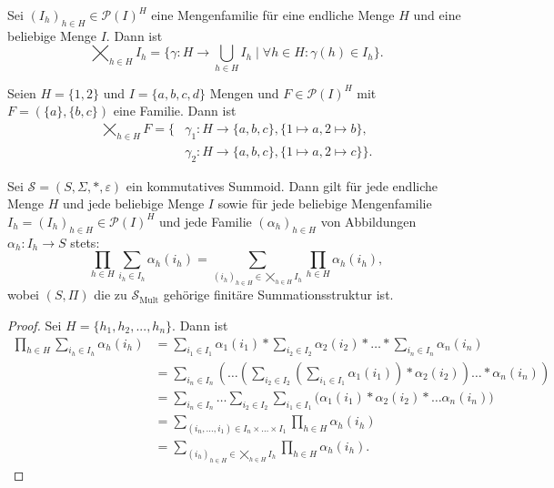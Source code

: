 \documentclass{article}
\begin{document}
\begin{definition}
  Sei $(I_h)_{h \in H} \in \mathcal{P}(I)^H$ eine Mengenfamilie für eine endliche Menge $H$ und eine beliebige Menge $I$.
  Dann ist 
  \begin{equation*}
    \bigtimes_{h \in H}I_h = \{\gamma \colon H \to \bigcup_{h \in H}I_h \mid \forall h \in H \colon \gamma(h) \in I_h\}.
  \end{equation*}
\end{definition}

\begin{example}
  Seien $H = \{1, 2\}$ und $I = \{a, b, c, d\}$ Mengen und $F \in \mathcal{P}(I)^H$ 
  mit $F = (\{a\}, \{b, c\})$ eine Familie.
  Dann ist
  \begin{align*}
    \bigtimes_{h \in H}F = \{&\gamma_1 \colon H \to \{a, b, c\}, \{ 1 \mapsto a, 2 \mapsto b\}, \\ 
                              &\gamma_2 \colon H \to \{a, b, c\}, \{ 1 \mapsto a, 2 \mapsto c\} \}.
  \end{align*}
\end{example}

\begin{theorem}\label{Theroem_Ausmultiplitzieren}
  Sei $\mathcal{S} = (S, \Sigma, \ast, \varepsilon)$ ein kommutatives Summoid.
  Dann gilt für jede endliche Menge $H$ und jede beliebige Menge $I$ sowie für jede beliebige Mengenfamilie $I_h = (I_h)_{h \in H} \in \mathcal{P}(I)^H$
  und jede Familie $(\alpha_h)_{h \in H}$ von Abbildungen $\alpha_h \colon I_h \to S$ stets:
  \begin{equation*}
    \prod_{h \in H}\sum_{i_h \in I_h}\alpha_h(i_h) = \sum_{(i_h)_{h \in H} \in \bigtimes_{h \in H}I_h}\prod_{h \in H}\alpha_h(i_h),
  \end{equation*}
  wobei $(S, \Pi)$ die zu $\mathcal{S}_\text{Mult}$ gehörige finitäre Summationsstruktur ist.
\end{theorem}
\begin{proof}
  Sei $H = \{h_1, h_2, ..., h_n\}$. Dann ist
  \begin{align*}
    \prod_{h \in H}\sum_{i_h \in I_h}\alpha_h(i_h)
    &= \sum_{i_1 \in I_1}\alpha_1(i_1) \ast \sum_{i_2 \in I_2}\alpha_2(i_2) \ast \dots \ast \sum_{i_n \in I_n}\alpha_n(i_n) \\
    &= \sum_{i_n \in I_n} \left( \dots \left( \sum_{i_2 \in I_2} \left( \sum_{i_1 \in I_1}\alpha_1(i_1) \right) \ast \alpha_2(i_2) \right) \dots \ast \alpha_n(i_n) \right) \\
    &= \sum_{i_n \in I_n} \dots \sum_{i_2 \in I_2} \sum_{i_1 \in I_1} \Big(\alpha_1(i_1) \ast \alpha_2(i_2) \ast \dots \alpha_n(i_n)\Big) \\
    &= \sum_{(i_n, \dots, i_1) \in I_n \times \dots \times I_1}\prod_{h \in H}\alpha_h(i_h) \\
    &= \sum_{(i_h)_{h \in H} \in \bigtimes_{h \in H}I_h}\prod_{h \in H}\alpha_h(i_h).
  \end{align*}  
\end{proof}
\end{document}
